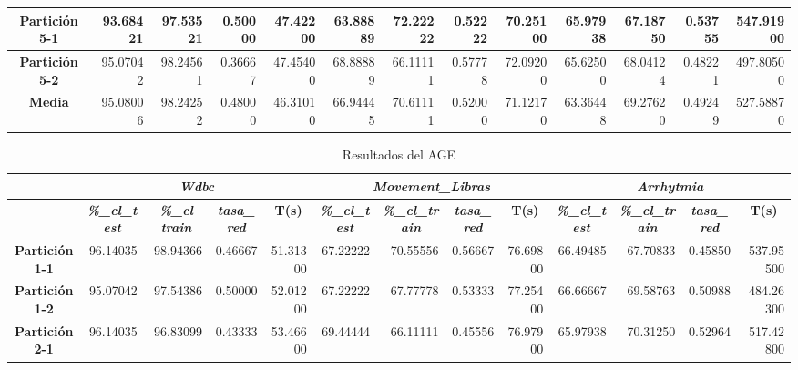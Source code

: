 \documentclass[a4paper,11pt]{article}
\begin{document}
\begin{table}[H]
\begin{adjustbox}{width=1.1\textwidth}
\begin{tabular}{|c|r|r|r|r|r|r|r|r|r|r|r|r|}
    \textbf{Partición 5-1} & 93.68421 & 97.53521 & 0.50000 & 47.42200 & 63.88889 & 72.22222 & 0.52222 & 70.25100 & 65.97938 & 67.18750 & 0.53755 & 547.91900 \\ \hline
    \textbf{Partición 5-2} & 95.07042 & 98.24561 & 0.36667 & 47.45400 & 68.88889 & 66.11111 & 0.57778 & 72.09200 & 65.62500 & 68.04124 & 0.48221 & 497.80500 \\ \hline
    \textbf{Media} & 95.08006 & 98.24252 & 0.48000 & 46.31010 & 66.94445 & 70.61111 & 0.52000 & 71.12170 & 63.36448 & 69.27620 & 0.49249 & 527.58870 \\ \hline
    \end{tabular}
    \end{adjustbox}
    \label{AGG}
  \end{table}
  
   \begin{table}[H]	
    \caption*{Resultados del AGE}
    \begin{adjustbox}{width=1.1\textwidth}
   \begin{tabular}{|c|r|r|r|r|r|r|r|r|r|r|r|r|}
    \hline
    \multicolumn{1}{|l|}{} & \multicolumn{ 4}{c|}{\textbf{\textit{Wdbc}}} & \multicolumn{ 4}{c|}{\textbf{\textit{Movement\_Libras}}} & \multicolumn{ 4}{c|}{\textbf{\textit{Arrhytmia}}} \\ \hline
    \multicolumn{1}{|l|}{} & \multicolumn{1}{c|}{\textbf{\textit{\%\_cl\_test}}} & \multicolumn{1}{c|}{\textbf{\textit{\%\_cl train}}} & \multicolumn{1}{c|}{\textbf{\textit{tasa\_red}}} & \multicolumn{1}{c|}{\textbf{T(s)}} & \multicolumn{1}{c|}{\textbf{\textit{\%\_cl\_test}}} & \multicolumn{1}{c|}{\textbf{\textit{\%\_cl\_train}}} & \multicolumn{1}{c|}{\textbf{\textit{tasa\_red}}} & \multicolumn{1}{c|}{\textbf{T(s)}} & \multicolumn{1}{c|}{\textbf{\textit{\%\_cl\_test}}} & \multicolumn{1}{c|}{\textbf{\textit{\%\_cl\_train}}} & \multicolumn{1}{c|}{\textbf{\textit{tasa\_red}}} & \multicolumn{1}{c|}{\textbf{T(s)}} \\ \hline
    \textbf{Partición 1-1} & 96.14035 & 98.94366 & 0.46667 & 51.31300 & 67.22222 & 70.55556 & 0.56667 & 76.69800 & 66.49485 & 67.70833 & 0.45850 & 537.95500 \\ \hline
    \textbf{Partición 1-2} & 95.07042 & 97.54386 & 0.50000 & 52.01200 & 67.22222 & 67.77778 & 0.53333 & 77.25400 & 66.66667 & 69.58763 & 0.50988 & 484.26300 \\ \hline
    \textbf{Partición 2-1} & 96.14035 & 96.83099 & 0.43333 & 53.46600 & 69.44444 & 66.11111 & 0.45556 & 76.97900 & 65.97938 & 70.31250 & 0.52964 & 517.42800 \\ \hline

\end{tabular}
\end{adjustbox}
\end{table}
\end{document}
